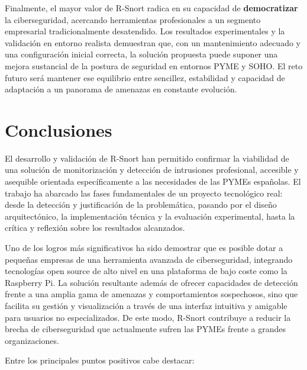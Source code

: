 \documentclass[11pt,a4paper,twoside]{report}
\begin{document}
Finalmente, el mayor valor de R-Snort radica en su capacidad de \textbf{democratizar} la ciberseguridad, acercando herramientas profesionales a un segmento empresarial tradicionalmente desatendido. Los resultados experimentales y la validación en entorno realista demuestran que, con un mantenimiento adecuado y una configuración inicial correcta, la solución propuesta puede suponer una mejora sustancial de la postura de seguridad en entornos PYME y SOHO. El reto futuro será mantener ese equilibrio entre sencillez, estabilidad y capacidad de adaptación a un panorama de amenazas en constante evolución.


\clearpage
\null
\thispagestyle{empty}
\newpage
\thispagestyle{empty}
\chapter*{Conclusiones}

El desarrollo y validación de R-Snort han permitido confirmar la viabilidad de una solución de monitorización y detección de intrusiones profesional, accesible y asequible orientada específicamente a las necesidades de las PYMEs españolas. El trabajo ha abarcado las fases fundamentales de un proyecto tecnológico real: desde la detección y justificación de la problemática, pasando por el diseño arquitectónico, la implementación técnica y la evaluación experimental, hasta la crítica y reflexión sobre los resultados alcanzados.\newline

Uno de los logros más significativos ha sido demostrar que es posible dotar a pequeñas empresas de una herramienta avanzada de ciberseguridad, integrando tecnologías open source de alto nivel en una plataforma de bajo coste como la Raspberry Pi. La solución resultante además de ofrecer capacidades de detección frente a una amplia gama de amenazas y comportamientos sospechosos, sino que facilita su gestión y visualización a través de una interfaz intuitiva y amigable para usuarios no especializados. De este modo, R-Snort contribuye a reducir la brecha de ciberseguridad que actualmente sufren las PYMEs frente a grandes organizaciones.\newline

Entre los principales puntos positivos cabe destacar:
\end{document}
